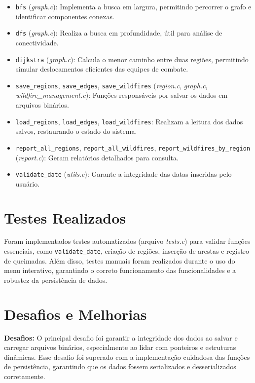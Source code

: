 \documentclass{article}
\begin{document}
\begin{itemize}
    \item \texttt{bfs} (\textit{graph.c}): Implementa a busca em largura, permitindo percorrer o grafo e identificar componentes conexas.
    \item \texttt{dfs} (\textit{graph.c}): Realiza a busca em profundidade, útil para análise de conectividade.
    \item \texttt{dijkstra} (\textit{graph.c}): Calcula o menor caminho entre duas regiões, permitindo simular deslocamentos eficientes das equipes de combate.
    \item \texttt{save\_regions}, \texttt{save\_edges}, \texttt{save\_wildfires} (\textit{region.c}, \textit{graph.c}, \textit{wildfire\_management.c}): Funções responsáveis por salvar os dados em arquivos binários.
    \item \texttt{load\_regions}, \texttt{load\_edges}, \texttt{load\_wildfires}: Realizam a leitura dos dados salvos, restaurando o estado do sistema.
    \item \texttt{report\_all\_regions}, \texttt{report\_all\_wildfires}, \texttt{report\_wildfires\_by\_region} (\textit{report.c}): Geram relatórios detalhados para consulta.
    \item \texttt{validate\_date} (\textit{utils.c}): Garante a integridade das datas inseridas pelo usuário.
\end{itemize}

\section{Testes Realizados}

Foram implementados testes automatizados (arquivo \textit{tests.c}) para validar funções essenciais, como \texttt{validate\_date}, criação de regiões, inserção de arestas e registro de queimadas. Além disso, testes manuais foram realizados durante o uso do menu interativo, garantindo o correto funcionamento das funcionalidades e a robustez da persistência de dados.

\section{Desafios e Melhorias}

\textbf{Desafios:} O principal desafio foi garantir a integridade dos dados ao salvar e carregar arquivos binários, especialmente ao lidar com ponteiros e estruturas dinâmicas. Esse desafio foi superado com a implementação cuidadosa das funções de persistência, garantindo que os dados fossem serializados e desserializados corretamente.
\end{document}
